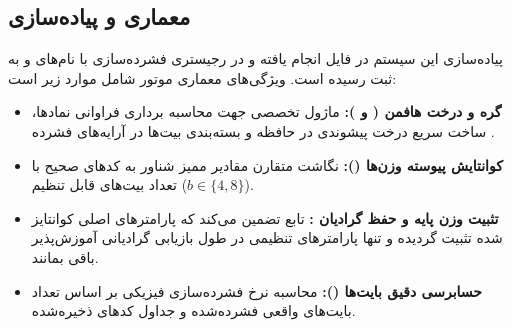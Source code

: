 \subsection{معماری و پیاده‌سازی}
پیاده‌سازی این سیستم در فایل  انجام یافته و در رجیستری فشرده‌سازی با نام‌های  و  به ثبت رسیده است. ویژگی‌های معماری موتور شامل موارد زیر است:
\begin{itemize}
    \item \textbf{گره و درخت هافمن ( و ):} ماژول تخصصی جهت محاسبه برداری فراوانی نمادها، ساخت سریع درخت پیشوندی در حافظه و بسته‌بندی بیت‌ها در آرایه‌های فشرده .
    \item \textbf{کوانتایش پیوسته وزن‌ها ():} نگاشت متقارن مقادیر ممیز شناور به کدهای صحیح با تعداد بیت‌های قابل تنظیم ($b \in \{4, 8\}$).
    \item \textbf{تثبیت وزن پایه و حفظ گرادیان :} تابع  تضمین می‌کند که پارامترهای اصلی کوانتایز شده تثبیت گردیده و تنها پارامترهای تنظیمی  در طول بازیابی گرادیانی آموزش‌پذیر باقی بمانند.
    \item \textbf{حسابرسی دقیق بایت‌ها ():} محاسبه نرخ فشرده‌سازی فیزیکی بر اساس تعداد بایت‌های واقعی فشرده‌شده و جداول کدهای ذخیره‌شده.
\end{itemize}
